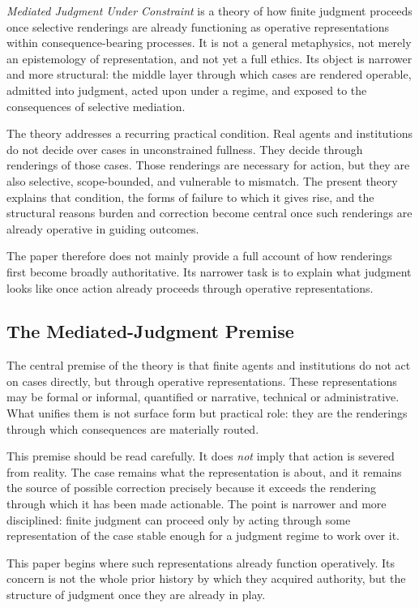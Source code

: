 \documentclass[11pt]{article}
\renewcommand{\emph}[1]{\textit{#1}}
\begin{document}
\emph{Mediated Judgment Under Constraint} is a theory of how finite judgment proceeds once selective renderings are already functioning as operative representations within consequence-bearing processes. It is not a general metaphysics, not merely an epistemology of representation, and not yet a full ethics. Its object is narrower and more structural: the middle layer through which cases are rendered operable, admitted into judgment, acted upon under a regime, and exposed to the consequences of selective mediation.

The theory addresses a recurring practical condition. Real agents and institutions do not decide over cases in unconstrained fullness. They decide through renderings of those cases. Those renderings are necessary for action, but they are also selective, scope-bounded, and vulnerable to mismatch. The present theory explains that condition, the forms of failure to which it gives rise, and the structural reasons burden and correction become central once such renderings are already operative in guiding outcomes.

The paper therefore does not mainly provide a full account of how renderings first become broadly authoritative. Its narrower task is to explain what judgment looks like once action already proceeds through operative representations.

\subsection{The Mediated-Judgment Premise}

The central premise of the theory is that finite agents and institutions do not act on cases directly, but through operative representations. These representations may be formal or informal, quantified or narrative, technical or administrative. What unifies them is not surface form but practical role: they are the renderings through which consequences are materially routed.

This premise should be read carefully. It does \emph{not} imply that action is severed from reality. The case remains what the representation is about, and it remains the source of possible correction precisely because it exceeds the rendering through which it has been made actionable. The point is narrower and more disciplined: finite judgment can proceed only by acting through some representation of the case stable enough for a judgment regime to work over it.

This paper begins where such representations already function operatively. Its concern is not the whole prior history by which they acquired authority, but the structure of judgment once they are already in play.
\end{document}
